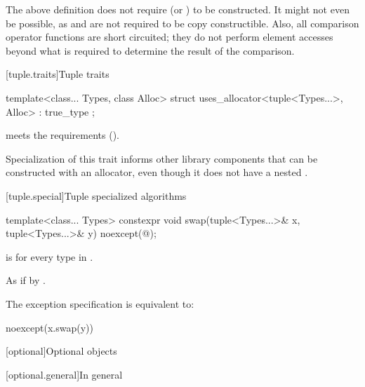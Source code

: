 \pnum
\begin{note}
The above definition does not require 
(or ) to be constructed. It might not
even be possible, as  and  are not required to be copy
constructible. Also, all comparison operator functions are short circuited;
they do not perform element accesses beyond what is required to determine the
result of the comparison.
\end{note}

[tuple.traits]{Tuple traits}

%
\begin{itemdecl}
template<class... Types, class Alloc>
  struct uses_allocator<tuple<Types...>, Alloc> : true_type { };
\end{itemdecl}

\begin{itemdescr}
\pnum
\expects
{} meets the 
requirements ().

\pnum
\begin{note}
Specialization of this trait informs other library components that
 can be constructed with an allocator, even though it does not have
a nested .
\end{note}
\end{itemdescr}

[tuple.special]{Tuple specialized algorithms}

%
\begin{itemdecl}
template<class... Types>
  constexpr void swap(tuple<Types...>& x, tuple<Types...>& y) noexcept(@\seebelow@);
\end{itemdecl}

\begin{itemdescr}
\pnum
\constraints
{} is 
for every type  in .

\pnum
\effects
As if by .

\pnum
\remarks
The exception specification is equivalent to:
\begin{codeblock}
noexcept(x.swap(y))
\end{codeblock}
\end{itemdescr}

[optional]{Optional objects}

[optional.general]{In general}

